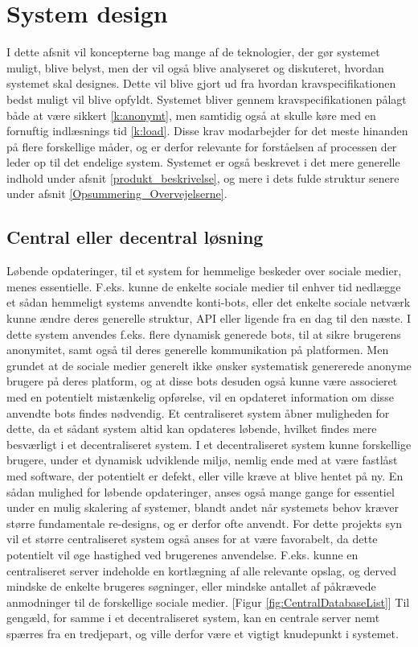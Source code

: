 \section{System design}
I dette afsnit vil koncepterne bag mange af de teknologier, der gør systemet muligt, blive belyst, men der vil også blive analyseret og diskuteret, hvordan systemet skal designes. Dette vil blive gjort ud fra hvordan kravspecifikationen bedst muligt vil blive opfyldt.
Systemet bliver gennem kravspecifikationen pålagt både at være sikkert \ref{k:anonymt}, men samtidig også at skulle køre med en fornuftig indlæsnings tid \ref{k:load}. Disse krav modarbejder for det meste hinanden på flere forskellige måder, og er derfor relevante for forståelsen af processen der leder op til det endelige system. Systemet er også beskrevet i det mere generelle indhold under afsnit \ref{produkt_beskrivelse}, og mere i dets fulde struktur senere under afsnit \ref{Opsummering_Overvejelserne}. 

\subsection{Central eller decentral løsning}
\label{Central_De_loesning}
Løbende opdateringer, til et system for hemmelige beskeder over sociale medier, menes essentielle. F.eks. kunne de enkelte sociale medier til enhver tid nedlægge et sådan hemmeligt systems anvendte konti-bots, eller det enkelte sociale netværk kunne ændre deres generelle struktur, API eller ligende fra en dag til den næste.
I dette system anvendes f.eks. flere dynamisk generede bots, til at sikre brugerens anonymitet, samt også til deres generelle kommunikation på platformen. Men grundet at de sociale medier generelt ikke ønsker systematisk genererede anonyme brugere på deres platform, og at disse bots desuden også kunne være associeret med en potentielt mistænkelig opførelse, vil en opdateret information om disse anvendte bots findes nødvendig.
Et centraliseret system åbner muligheden for dette, da et sådant system altid kan opdateres løbende, hvilket findes mere besværligt i et decentraliseret system. I et decentraliseret system kunne forskellige brugere, under et dynamisk udviklende miljø, nemlig ende med at være fastlåst med software, der potentielt er defekt, eller ville kræve at blive hentet på ny.
En sådan mulighed for løbende opdateringer, anses også mange gange for essentiel under en mulig skalering af systemer, blandt andet når systemets behov kræver større fundamentale re-designs, og er derfor ofte anvendt.
For dette projekts syn vil et større centraliseret system også anses for at være favorabelt, da dette potentielt vil øge hastighed ved brugerenes anvendelse. F.eks. kunne en centraliseret server indeholde en kortlægning af alle relevante opslag, og derved mindske de enkelte brugeres søgninger, eller mindske antallet af påkrævede anmodninger til de forskellige sociale medier. [Figur \ref{fig:CentralDatabaseList}]
Til gengæld, for samme i et decentraliseret system, kan en centrale server nemt spærres fra en tredjepart, og ville derfor være et vigtigt knudepunkt i systemet.

